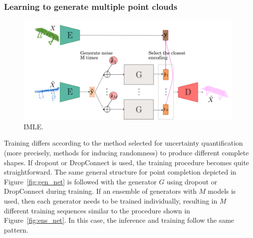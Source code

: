         \subsubsection{Learning to generate multiple point clouds}
        \begin{figure}[htb]
          \begin{center}
          \includegraphics[width=\linewidth]{figures/implicit_gen_network_imle.png}
          \end{center}
          \caption{IMLE.}\label{fig:imle}
        \end{figure}
        Training differs according to the method selected for uncertainty quantification (more precisely, methods for inducing randomness) to produce different complete shapes. If dropout or DropConnect is used, the training procedure becomes quite straightforward. The same general structure for point completion depicted in Figure~\ref{fig:gen_net} is followed with the generator $G$ using dropout or DropConnect during training. If an ensemble of generators with $M$ models is used, then each generator needs to be trained individually, resulting in $M$ different training sequences similar to the procedure shown in Figure~\ref{fig:ens_net}. In this case, the inference and training follow the same pattern. 
        \newline
        
